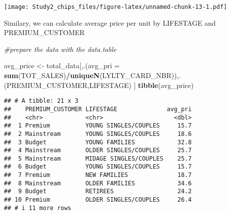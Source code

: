 \documentclass[
]{article}
\newenvironment{Shaded}{\begin{snugshade}}{\end{snugshade}}
\newcommand{\AttributeTok}[1]{\textcolor[rgb]{0.13,0.29,0.53}{#1}}
\newcommand{\CommentTok}[1]{\textcolor[rgb]{0.56,0.35,0.01}{\textit{#1}}}
\newcommand{\DecValTok}[1]{\textcolor[rgb]{0.00,0.00,0.81}{#1}}
\newcommand{\FloatTok}[1]{\textcolor[rgb]{0.00,0.00,0.81}{#1}}
\newcommand{\FunctionTok}[1]{\textcolor[rgb]{0.13,0.29,0.53}{\textbf{#1}}}
\newcommand{\NormalTok}[1]{#1}
\newcommand{\OtherTok}[1]{\textcolor[rgb]{0.56,0.35,0.01}{#1}}
\newcommand{\SpecialCharTok}[1]{\textcolor[rgb]{0.81,0.36,0.00}{\textbf{#1}}}
\newcommand{\StringTok}[1]{\textcolor[rgb]{0.31,0.60,0.02}{#1}}
\begin{document}
\begin{Shaded}
\end{Shaded}

\texttt{[image: Study2\_chips\_files/figure-latex/unnamed-chunk-13-1.pdf]}

Similary, we can calculate average price per unit by LIFESTAGE and
PREMIUM\_CUSTOMER

\begin{Shaded}
\begin{Highlighting}[]
\CommentTok{\#prepare the data with the data.table}

\NormalTok{avg\_price }\OtherTok{\textless{}{-}}\NormalTok{ total\_data[,.(}\AttributeTok{avg\_pri =} \FunctionTok{sum}\NormalTok{(TOT\_SALES)}\SpecialCharTok{/}\FunctionTok{uniqueN}\NormalTok{(LYLTY\_CARD\_NBR)),.(PREMIUM\_CUSTOMER,LIFESTAGE) ]}
\FunctionTok{tibble}\NormalTok{(avg\_price)}
\end{Highlighting}
\end{Shaded}

\begin{verbatim}
## # A tibble: 21 x 3
##    PREMIUM_CUSTOMER LIFESTAGE              avg_pri
##    <chr>            <chr>                    <dbl>
##  1 Premium          YOUNG SINGLES/COUPLES     15.7
##  2 Mainstream       YOUNG SINGLES/COUPLES     18.6
##  3 Budget           YOUNG FAMILIES            32.8
##  4 Mainstream       OLDER SINGLES/COUPLES     25.7
##  5 Mainstream       MIDAGE SINGLES/COUPLES    25.7
##  6 Budget           YOUNG SINGLES/COUPLES     15.7
##  7 Premium          NEW FAMILIES              18.7
##  8 Mainstream       OLDER FAMILIES            34.6
##  9 Budget           RETIREES                  24.2
## 10 Premium          OLDER SINGLES/COUPLES     26.4
## # i 11 more rows
\end{verbatim}
\end{document}
